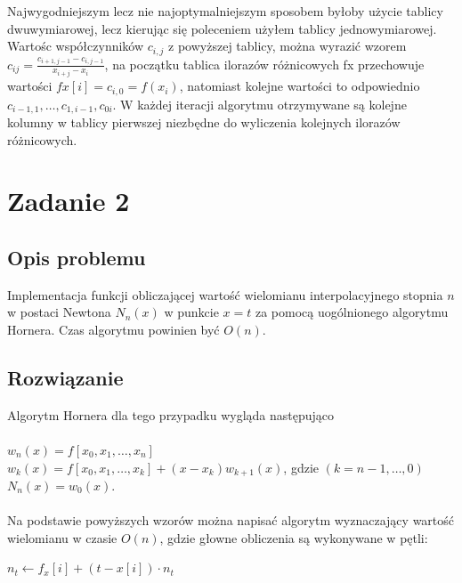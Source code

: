 \documentclass[12pt, a4paper]{article}
\begin{document}
Najwygodniejszym lecz nie najoptymalniejszym sposobem byłoby użycie tablicy dwuwymiarowej, lecz kierując się poleceniem użyłem tablicy jednowymiarowej. Wartośc współczynników $c_{i,j}$ z powyższej tablicy, można wyrazić wzorem $c_{ij} = \frac{c_{i+1,j-1} - c_{i,j-1}}{x_{i+j} - x_{i}}$, na początku tablica ilorazów różnicowych fx przechowuje wartości $fx[i]=c_{i,0}=f(x_i)$, natomiast kolejne wartości to odpowiednio $c_{i-1, 1}, \ldots, c_{1,i-1}, c_{0i}$. W każdej iteracji algorytmu otrzymywane są kolejne kolumny w tablicy pierwszej niezbędne do wyliczenia kolejnych ilorazów różnicowych.

\newpage

\section{Zadanie 2}
\subsection{Opis problemu}
Implementacja funkcji obliczającej wartość wielomianu interpolacyjnego stopnia $n$ w postaci Newtona $N_n(x)$ w punkcie $x=t$ za pomocą uogólnionego algorytmu Hornera. Czas algorytmu powinien być $O(n)$.
 
\subsection{Rozwiązanie}
Algorytm Hornera dla tego przypadku wygląda następująco\\\\
$w_{n}(x) = f[x_{0}, x_{1}, \ldots, x_{n}]$ \\
$w_{k}(x) = f[x_{0}, x_{1}, \ldots, x_{k}] + (x - x_{k})w_{k+1}(x)$, gdzie $(k = n - 1, \ldots, 0)$ \\
$N_{n}(x) = w_{0}(x)$. \\\\

Na podstawie powyższych wzorów można napisać algorytm wyznaczający wartość wielomianu w czasie $O(n)$, gdzie głowne obliczenia są wykonywane w pętli:

\begin{algorithm}
    \begin{algorithmic}[1]
                \State $n_{t} \gets f_{x}[i] + (t - x[i]) \cdot n_{t}$
            \EndFor
    \end{algorithmic}
\end{algorithm} 
\end{document}
